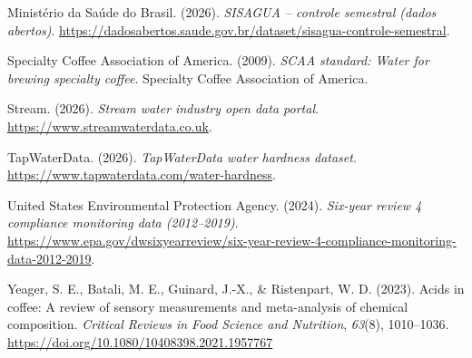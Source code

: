 \documentclass[
  a4paper,
]{article}
\newlength{\cslhangindent}
\newenvironment{CSLReferences}[2] %
 {\begin{list}{}{%
  \setlength{\itemindent}{0pt}
  \setlength{\leftmargin}{0pt}
  \setlength{\parsep}{0pt}
  \ifodd #1
   \setlength{\leftmargin}{\cslhangindent}
   \setlength{\itemindent}{-1\cslhangindent}
  \fi
  \setlength{\itemsep}{#2\baselineskip}}}
 {\end{list}}
\begin{document}
\begin{CSLReferences}{1}{0}
Ministério da Saúde do Brasil. (2026). \emph{SISAGUA -- controle
semestral (dados abertos)}.
\url{https://dadosabertos.saude.gov.br/dataset/sisagua-controle-semestral}.

Specialty Coffee Association of America. (2009). \emph{SCAA standard:
Water for brewing specialty coffee}. Specialty Coffee Association of
America.

Stream. (2026). \emph{Stream water industry open data portal}.
\url{https://www.streamwaterdata.co.uk}.

TapWaterData. (2026). \emph{TapWaterData water hardness dataset}.
\url{https://www.tapwaterdata.com/water-hardness}.

United States Environmental Protection Agency. (2024). \emph{Six-year
review 4 compliance monitoring data (2012--2019)}.
\url{https://www.epa.gov/dwsixyearreview/six-year-review-4-compliance-monitoring-data-2012-2019}.

Yeager, S. E., Batali, M. E., Guinard, J.-X., \& Ristenpart, W. D.
(2023). Acids in coffee: A review of sensory measurements and
meta-analysis of chemical composition. \emph{Critical Reviews in Food
Science and Nutrition}, \emph{63}(8), 1010--1036.
\url{https://doi.org/10.1080/10408398.2021.1957767}

\end{CSLReferences}
\end{document}

